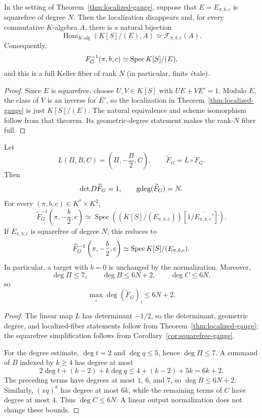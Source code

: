\begin{corollary}
\label{cor:squarefree-gauge}
In the setting of Theorem~\ref{thm:localized-gauge}, suppose that
$E=E_{\pi,b,c}$ is squarefree of degree $N$.  Then the localization
disappears and, for every commutative $K$-algebra $A$, there is a natural
bijection
\begin{equation}
 \operatorname{Hom}_{K\text{-alg}}(K[S]/(E),A)
 \simeq \mathcal F_{\pi,b,c}(A).
 \label{eq:natural-fiber-equivalence}
\end{equation}
Consequently,
\[
 F_G^{-1}(\pi,b,c)\simeq\operatorname{Spec} K[S]/(E),
\]
and this is a full Keller fiber of rank \(N\) (in particular, finite
\'etale).
\end{corollary}

\begin{proof}
Since $E$ is squarefree, choose $U,V\in K[S]$ with $UE+VE'=1$.  Modulo $E$,
the class of $V$ is an inverse for $\overline{E'}$, so the localization in
Theorem~\ref{thm:localized-gauge} is just $K[S]/(E)$.  The natural equivalence
and scheme isomorphism follow from that theorem.  Its geometric-degree
statement makes the rank-$N$ fiber full.
\end{proof}

\begin{corollary}\label{cor:effective-gauge}
Let
\[
 L(\Pi,B,C)=\left(\Pi,-\frac{B}{2},C\right),
 \qquad \widetilde F_G=L\circ F_G.
\]
Then
\[
 \det D\widetilde F_G=1,
 \qquad \operatorname{gdeg}(\widetilde F_G)=N.
\]
For every $(\pi,b,c)\in K^*\times K^2$,
\[
 \widetilde F_G^{-1}\left(\pi,-\frac b2,c\right)
 \simeq
 \operatorname{Spec}\left(
   (K[S]/(E_{\pi,b,c}))[1/\overline{E_{\pi,b,c}'}]
 \right).
\]
If $E_{\pi,b,c}$ is squarefree of degree $N$, this reduces to
\[
 \widetilde F_G^{-1}\left(\pi,-\frac b2,c\right)
 \simeq\operatorname{Spec} K[S]/(E_{\pi,b,c}).
\]
In particular, a target with $b=0$ is unchanged by the normalization.
Moreover,
\[
 \deg\Pi\leq7,
 \qquad \deg B\leq6N+2,
 \qquad \deg C\leq6N,
\]
so
\[
 \boxed{\max_i\deg(\widetilde F_G)_i\leq6N+2.}
\]
\end{corollary}

\begin{proof}
The linear map $L$ has determinant $-1/2$, so the determinant, geometric
degree, and localized-fiber statements follow from
Theorem~\ref{thm:localized-gauge}; the squarefree simplification follows from
Corollary~\ref{cor:squarefree-gauge}.

For the degree estimate, $\deg t=2$ and $\deg q\leq5$, hence
$\deg\Pi\leq7$.  A summand of $B$ indexed by $k\geq4$ has degree at most
\[
 2\deg t+(k-2)+k\deg q\leq4+(k-2)+5k=6k+2.
\]
The preceding terms have degrees at most $1$, $6$, and $7$, so
$\deg B\leq6N+2$.  Similarly, $(xq)^k$ has degree at most $6k$, while the
remaining terms of $C$ have degree at most $4$.  Thus $\deg C\leq6N$.
A linear output normalization does not change these bounds.
\end{proof}

